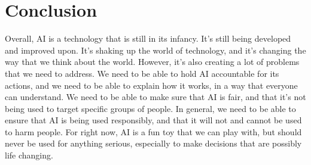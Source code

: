 \documentclass[12pt]{article}
\begin{document}
    \section{Conclusion}
    Overall, AI is a technology that is still in its infancy. It's still being developed and
    improved upon. It's shaking up the world of technology, and it's changing the way that we think
    about the world. However, it's also creating a lot of problems that we need to address. We need
    to be able to hold AI accountable for its actions, and we need to be able to explain how it works,
    in a way that everyone can understand. We need to be able to make sure that AI is fair, and that
    it's not being used to target specific groups of people. In general, we need to be able to ensure
    that AI is being used responsibly, and that it will not and cannot be used to harm people. For
    right now, AI is a fun toy that we can play with, but should never be used for anything serious,
    especially to make decisions that are possibly life changing.
\end{document}
